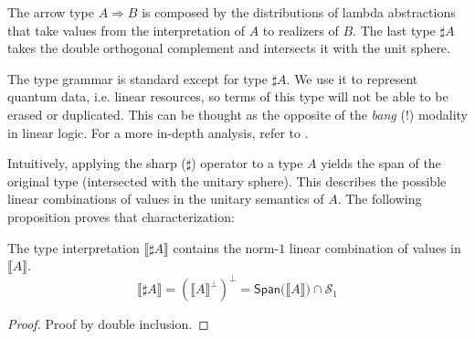 \documentclass[runningheads,orivec,envcountsame,envcountsect]{llncs}
\providecommand{\qed}{\hbox{\rule{1ex}{1ex}}}%
\newcommand{\qedhere}{%
  \ifmmode
    \tag*{\qed}%
  \else
    \hfill\qed%
  \fi
}
\newcommand\Span[1]{\ensuremath{{\mathsf{Span}}{#1}}}
\def\Sph{\mathcal{S}_1}       %
\def\scal#1#2{\langle{#1}~|~{#2}\rangle}
\def\Arr{\Rightarrow}
\def\sem#1{\llbracket#1\rrbracket}
\begin{document}
The arrow type $A\Arr B$ is composed by the distributions of lambda abstractions that take values from the interpretation of $A$ to realizers of $B$. The last type $\sharp A$ takes the double orthogonal complement and intersects it with the unit sphere. 

The type grammar is standard except for type $\sharp A$. We use it to represent quantum data, i.e. linear resources, so terms of this type will not be able to be erased or duplicated. This can be thought as the opposite of the \textit{bang} ($!$) modality in linear logic. For a more in-depth analysis, refer to \cite{DiazcaroCIE2025}.

Intuitively, applying the sharp ($\sharp$) operator to a type $A$ yields the span of the original type (intersected with the unitary sphere). This describes the possible linear combinations of values in the unitary semantics of $A$. The following proposition proves that characterization:

\begin{theorem}\label{prop:SharpCharacterization}
  The type interpretation $\sem{\sharp A}$ contains the norm-$1$ linear combination of values in $\sem{A}$.
  \[
  \sem{\sharp A} = (\sem{A}^\bot)^\bot = \Span(\sem{A})\cap\Sph
  \]
\end{theorem}

\begin{proof}
  Proof by double inclusion.
\end{proof}
\end{document}
